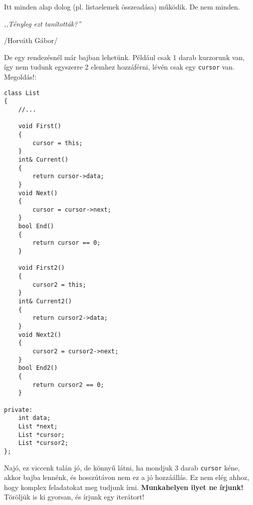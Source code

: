 \documentclass[a4paper,11.5pt]{article}
\begin{document}
	\medskip
	Itt minden alap dolog (pl. listaelemek összeadása) működik. De nem minden.
	\begin{center}
		\textit{,,Tényleg ezt tanították?''}
			
			/Horváth Gábor/
	\end{center}
	De egy rendezésnél már bajban lehetünk. Például csak 1 darab kurzorunk van, így nem tudunk egyszerre 2 elemhez hozzáférni, lévén csak egy \texttt{cursor} van. Megoldás!:
\begin{lstlisting}
class List
{
	//...
	
	void First()
	{
		cursor = this;
	}
	int& Current()
	{
		return cursor->data;
	}
	void Next()
	{
		cursor = cursor->next;
	}	
	bool End()
	{
		return cursor == 0;
	}
	
	void First2()
	{
		cursor2 = this;
	}
	int& Current2()
	{
		return cursor2->data;
	}
	void Next2()
	{
		cursor2 = cursor2->next;
	}	
	bool End2()
	{
		return cursor2 == 0;
	}
	
private:
	int data;
	List *next;
	List *cursor;
	List *cursor2;
};
\end{lstlisting}
	Najó, ez viccenk talán jó, de könnyű látni, ha mondjuk 3 darab \texttt{cursor} kéne, akkor bajba lennénk, és hosszútávon nem ez a jó hozzáállás. Ez nem elég ahhoz, hogy komplex feladatokat meg tudjunk írni. \textbf{Munkahelyen ilyet ne írjunk!} Töröljük is ki gyorsan, és írjunk egy iterátort!
\end{document}
